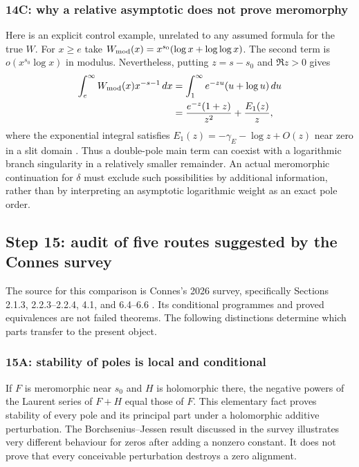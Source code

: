\documentclass[11pt]{amsart}
\numberwithin{equation}{section}
\theoremstyle{plain}
\theoremstyle{definition}
\theoremstyle{remark}
\begin{document}
\subsubsection{14C: why a relative asymptotic does not prove meromorphy}
\label{subsubsec:a12-branch-model}
Here is an explicit control example, unrelated to any assumed formula
for the true $W$. For $x\ge e$ take
$W_{\rm mod}(x)=x^{s_0}(\log x+\log\log x)$.
The second term is $o(x^{s_0}\log x)$ in modulus. Nevertheless, putting
$z=s-s_0$ and $\Re z>0$ gives
\begin{align}
\int_e^\infty W_{\rm mod}(x)x^{-s-1}\,dx
&=\int_1^\infty e^{-zu}(u+\log u)\,du\notag\\
&=\frac{e^{-z}(1+z)}{z^2}+\frac{E_1(z)}z,
\label{eq:a12-branch-example}
\end{align}
where the exponential integral satisfies
$E_1(z)=-\gamma_{\!E}-\log z+O(z)$ near zero in a slit domain
\cite{DLMF}. Thus a double-pole main term can coexist with a logarithmic
branch singularity in a relatively smaller remainder.
An actual meromorphic continuation for $\delta$ must exclude such
possibilities by additional information, rather than by interpreting
an asymptotic logarithmic weight as an exact pole order.

\subsection{Step 15: audit of five routes suggested by the Connes survey}
\label{subsec:a12-Connes-survey}
The source for this comparison is Connes's 2026 survey, specifically
Sections 2.1.3, 2.2.3--2.2.4, 4.1, and 6.4--6.6
\cite{Connes2026}. Its conditional programmes and proved equivalences
are not failed theorems. The following distinctions determine which
parts transfer to the present object.

\subsubsection{15A: stability of poles is local and conditional}
\label{subsubsec:a12-pole-stability}
If $F$ is meromorphic near $s_0$ and $H$ is holomorphic there, the negative
powers of the Laurent series of $F+H$ equal those of $F$.
This elementary fact proves stability of every pole and its principal
part under a holomorphic additive perturbation.
The Borchsenius--Jessen result discussed in the survey illustrates very
different behaviour for zeros after adding a nonzero constant.
It does not prove that every conceivable perturbation destroys a zero
alignment.
\end{document}
